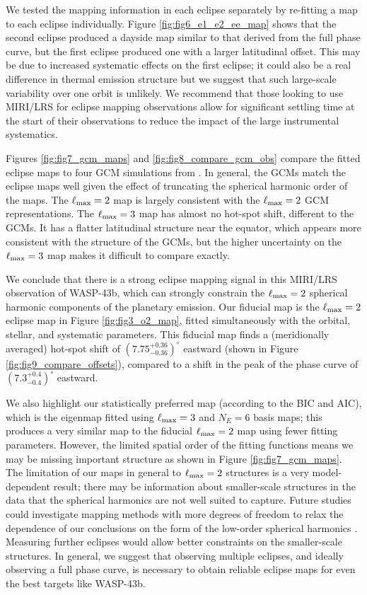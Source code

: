 \documentclass[twocolumn]{aastex631}
\begin{document}
We tested the mapping information in each eclipse separately by re-fitting a map to each eclipse individually. Figure \ref{fig:fig6_e1_e2_ee_map} shows that the second eclipse produced a dayside map similar to that derived from the full phase curve, but the first eclipse produced one with a larger latitudinal offset. This may be due to increased systematic effects on the first eclipse; it could also be a real difference in thermal emission structure but we suggest that such large-scale variability over one orbit is unlikely. We recommend that those looking to use MIRI/LRS for eclipse mapping observations allow for significant settling time at the start of their observations to reduce the impact of the large instrumental systematics.

Figures \ref{fig:fig7_gcm_maps} and \ref{fig:fig8_compare_gcm_obs} compare the fitted eclipse maps to four GCM simulations from \citet{bell2023wasp43b}. In general, the GCMs match the eclipse maps well given the effect of truncating the spherical harmonic order of the maps. The $\ell_{\rm max}=2$ map is largely consistent with the $\ell_{\rm max}=2$ GCM representations. The $\ell_{\rm max}=3$ map has almost no hot-spot shift, different to the GCMs. It has a flatter latitudinal structure near the equator, which appears more consistent with the structure of the GCMs, but the higher uncertainty on the $\ell_{\rm max}=3$ map makes it difficult to compare exactly.

We conclude that there is a strong eclipse mapping signal in this MIRI/LRS observation of WASP-43b, which can strongly constrain the $\ell_{\rm max}=2$ spherical harmonic components of the planetary emission. Our fiducial map is the $\ell_{\rm max}=2$ eclipse map in Figure \ref{fig:fig3_o2_map}, fitted simultaneously with the orbital, stellar, and systematic parameters. This fiducial map finds a (meridionally averaged) hot-spot shift of $(7.75^{+0.36}_{-0.36})^{\circ}$  eastward (shown in Figure \ref{fig:fig9_compare_offsets}), compared to a shift in the peak of the phase curve of $(7.3^{+0.4}_{-0.4})^{\circ}$ eastward.

We also highlight our statistically preferred map (according to the BIC and AIC), which is the eigenmap fitted using $\ell_{\rm max}=3$ and $N_{E}=6$ basis maps; this produces a very similar map to the fiducial $\ell_{\rm max}=2$ map using fewer fitting parameters. However, the limited spatial order of the fitting functions means we may be missing important structure as shown in Figure \ref{fig:fig7_gcm_maps}. The limitation of our maps in general to $\ell_{\rm max}=2$ structures is a very model-dependent result; there may be information about smaller-scale structures in the data that the spherical harmonics are not well suited to capture. Future studies could investigate mapping methods with more degrees of freedom to relax the dependence of our conclusions on the form of the low-order spherical harmonics \citep{horne1985images}. Measuring further eclipses would allow better constraints on the smaller-scale structures. In general, we suggest that observing multiple eclipses, and ideally observing a full phase curve, is necessary to obtain reliable eclipse maps for even the best targets like WASP-43b. 
\end{document}
